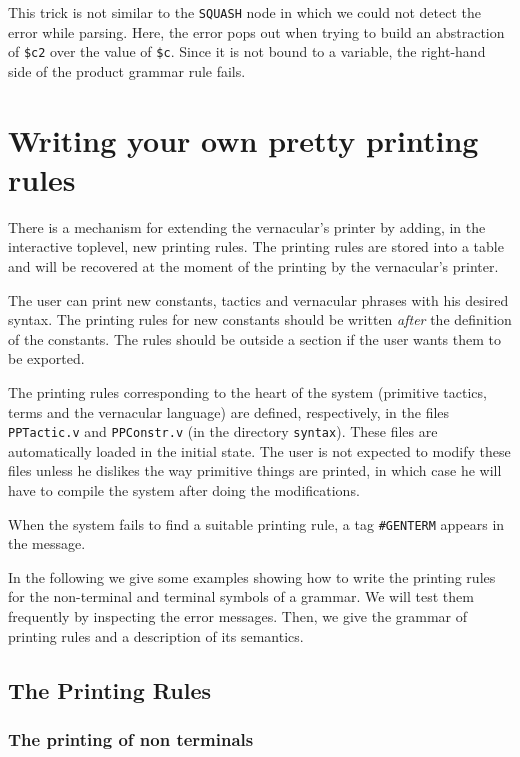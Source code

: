 {\noindent This trick is not similar to the {\tt SQUASH} node in which
we could not detect the error while parsing. Here, the error pops out
when trying to build an abstraction of {\tt\$c2} over the value of
{\tt\$c}. Since it is not bound to a variable, the right-hand side of
the product grammar rule fails.
 
\section{Writing your own pretty printing rules}
\label{Syntax}

There is a mechanism for extending the
vernacular's printer by adding, in the interactive
toplevel, new printing rules.  The printing rules are stored into a
table and will be recovered at the moment of the printing by the
vernacular's printer.

The user can print new constants, tactics and vernacular phrases
with his desired syntax.  The printing rules
for new constants should be written {\em after} the definition of the
constants. The rules should be
outside a section if the user wants them to be exported.

The printing rules corresponding to the heart of the system (primitive
tactics, terms and the vernacular language) are defined,
respectively, in the files {\tt PPTactic.v} and {\tt PPConstr.v}
(in the directory {\tt syntax}). These files are automatically
loaded in the initial state. The user is not expected to modify these
files unless he dislikes the way primitive things are printed, in
which case he will have to compile the system after doing the
modifications.

When the system fails to find a suitable printing rule, a tag
\verb+#GENTERM+ appears in the message.

In the following we give some examples showing how to write the
printing rules for the non-terminal and terminal symbols of a
grammar. We will test them frequently by inspecting the error
messages.  Then, we give the grammar of printing rules and a
description of its semantics.


\subsection{The Printing Rules}
\subsubsection{The printing of non terminals}

}
